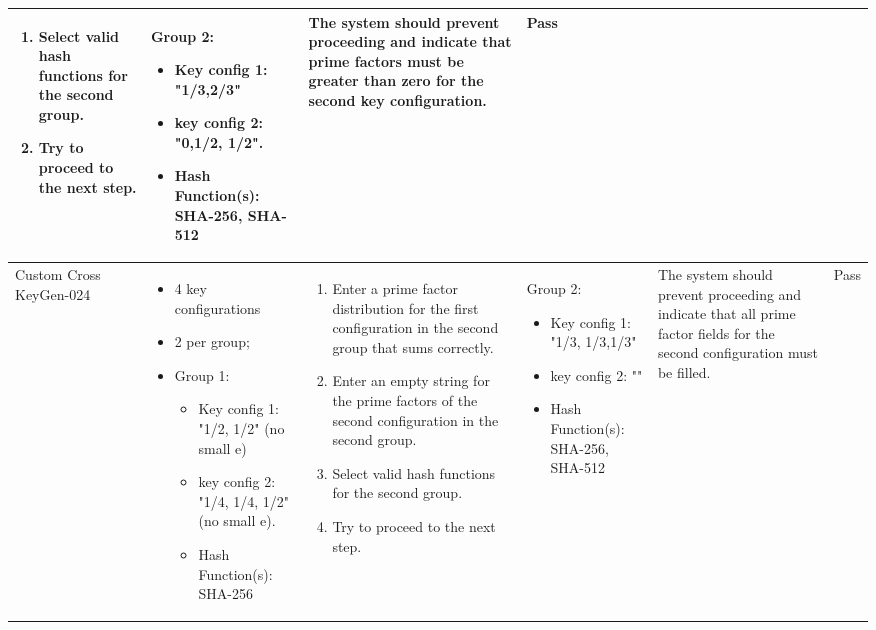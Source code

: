 \documentclass[]{final_report}
\theoremstyle{definition}
\begin{document}
\begin{longtable}{|p{1.5cm}|p{2.5cm}|p{3.5cm}|p{2.5cm}|p{3cm}|p{2cm}|}
\begin{enumerate}
    \item Select valid hash functions for the second group.
    \item Try to proceed to the next step.
  \end{enumerate} & 
  Group 2: 
    \begin{itemize}
 \item Key config 1: "1/3,2/3"
 \item key config 2:  "0,1/2,
 1/2". 
 \item Hash Function(s): SHA-256, SHA-512
    \end{itemize} & The system should prevent proceeding and indicate that prime factors must be greater than zero for the second key configuration. & Pass \\
  \hline
  Custom
  Cross
  KeyGen-024 &   
  \begin{itemize}
  \item 4 key configurations
  \item 2 per group; 
  \item Group 1: 
    \begin{itemize}
 \item Key config 1: "1/2, 1/2" (no small e) 
 \item key config 2:  "1/4,
 1/4,
 1/2" (no small e). 
 \item Hash Function(s): SHA-256
    \end{itemize} 
     \end{itemize} 
    & 
  \begin{enumerate}
    \item Enter a prime factor distribution for the first configuration in the second group that sums correctly.
    \item Enter an empty string for the prime factors of the second configuration in the second group.
    \item Select valid hash functions for the second group.
    \item Try to proceed to the next step.
  \end{enumerate} & 
    Group 2: 
    \begin{itemize}
 \item Key config 1: "1/3,
 1/3,1/3"
 \item key config 2:  ""
 \item Hash Function(s): SHA-256, SHA-512
    \end{itemize}
     & The system should prevent proceeding and indicate that all prime factor fields for the second configuration must be filled. & Pass \\

\end{longtable}
\end{document}
